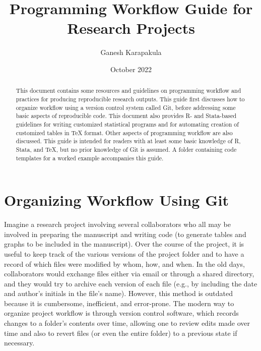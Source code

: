 \documentclass[12pt]{article}
\begin{document}
\author{Ganesh Karapakula}
\title{Programming Workflow Guide for Research Projects \vspace{-2mm}}
\date{\vspace{-1mm}\small October 2022}

\maketitle

\vspace{-12mm}
\begin{abstract} 
\noindent This document contains some resources and guidelines on programming workflow and practices for producing reproducible research outputs. This guide first discusses how to organize workflow using a version control system called Git, before addressing some basic aspects of reproducible code. This document also provides R- and Stata-based guidelines for writing customized statistical programs and for automating creation of customized tables in TeX format. Other aspects of programming workflow are also discussed. This guide is intended for readers with at least some basic knowledge of R, Stata, and TeX, but no prior knowledge of Git is assumed. A folder containing code templates for a worked example accompanies this guide.
\end{abstract}

\onehalfspacing

\section{Organizing Workflow Using Git}
\label{section:git}

Imagine a research project involving several collaborators who all may be involved in preparing the manuscript and writing code (to generate tables and graphs to be included in the manuscript). Over the course of the project, it is useful to keep track of the various versions of the project folder and to have a record of which files were modified by whom, how, and when. In the old days, collaborators would exchange files either via email or through a shared directory, and they would try to archive each version of each file (e.g., by including the date and author's initials in the file's name). However, this method is outdated because it is cumbersome, inefficient, and error-prone. The modern way to organize project workflow is through version control software, which records changes to a folder's contents over time, allowing one to review edits made over time and also to revert files (or even the entire folder) to a previous state if necessary.
\end{document}
